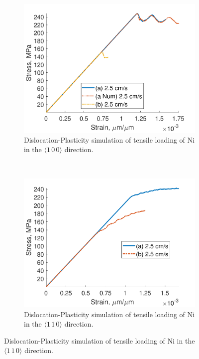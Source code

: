 \begin{figure}
    \begin{subfigure}[t]{0.45\linewidth}
        \centering
        \includegraphics[width=\linewidth]{../data/Ni100_DDD.pdf}
        \caption[Dislocation-Plasticity simulation of tensile loading of Ni in the $\langle 1\, 0\, 0 \rangle$ direction.]{Dislocation-Plasticity simulation of tensile loading of Ni in the $\langle 1\, 0\, 0 \rangle$ direction.}
        \label{sc:Ni100_DDD}
    \end{subfigure}
    ~
    \begin{subfigure}[t]{0.45\linewidth}
        \centering
        \includegraphics[width=\linewidth]{../data/Ni110_DDD.pdf}
        \caption[Dislocation-Plasticity simulation of tensile loading of Ni in the $\langle 1\, 1\, 0 \rangle$ direction.]{Dislocation-Plasticity simulation of tensile loading of Ni  in the $\langle 1\, 1\, 0 \rangle$ direction.}
        \label{sc:Ni110_DDD}
    \end{subfigure}
\end{figure}

